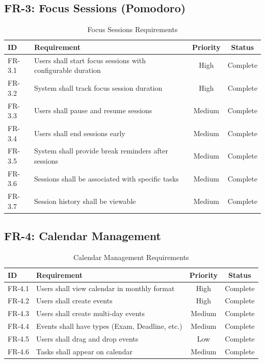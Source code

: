        \subsection{FR-3: Focus Sessions (Pomodoro)}
        \begin{table}[H]
        \centering
        \begin{tabular}{|l|p{7cm}|c|c|}
        \hline
        \textbf{ID} & \textbf{Requirement} & \textbf{Priority} & \textbf{Status} \\
        \hline
        FR-3.1 & Users shall start focus sessions with configurable duration & High & Complete \\
        FR-3.2 & System shall track focus session duration & High & Complete \\
        FR-3.3 & Users shall pause and resume sessions & Medium & Complete \\
        FR-3.4 & Users shall end sessions early & Medium & Complete \\
        FR-3.5 & System shall provide break reminders after sessions & Medium & Complete \\
        FR-3.6 & Sessions shall be associated with specific tasks & Medium & Complete \\
        FR-3.7 & Session history shall be viewable & Medium & Complete \\
        \hline
        \end{tabular}
        \caption{Focus Sessions Requirements}
        \end{table}

        \subsection{FR-4: Calendar Management}
        \begin{table}[H]
        \centering
        \begin{tabular}{|l|p{7cm}|c|c|}
        \hline
        \textbf{ID} & \textbf{Requirement} & \textbf{Priority} & \textbf{Status} \\
        \hline
        FR-4.1 & Users shall view calendar in monthly format & High & Complete \\
        FR-4.2 & Users shall create events & High & Complete \\
        FR-4.3 & Users shall create multi-day events & Medium & Complete \\
        FR-4.4 & Events shall have types (Exam, Deadline, etc.) & Medium & Complete \\
        FR-4.5 & Users shall drag and drop events & Low & Complete \\
        FR-4.6 & Tasks shall appear on calendar & Medium & Complete \\
        \hline
        \end{tabular}
        \caption{Calendar Management Requirements}
        \end{table}

